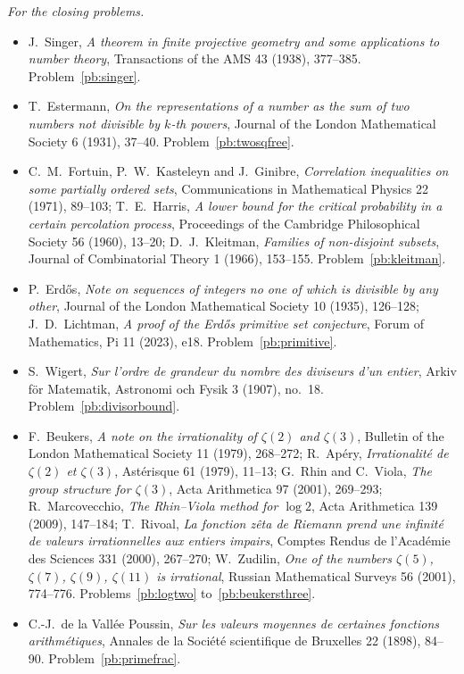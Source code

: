 \noindent\emph{For the closing problems.}
\begin{itemize}
\item J.~Singer, \emph{A theorem in finite projective geometry and some applications to number theory}, Transactions of the AMS 43 (1938), 377--385. Problem~\ref{pb:singer}.
\item T.~Estermann, \emph{On the representations of a number as the sum of two numbers not divisible by $k$-th powers}, Journal of the London Mathematical Society 6 (1931), 37--40. Problem~\ref{pb:twosqfree}.
\item C.~M.~Fortuin, P.~W.~Kasteleyn and J.~Ginibre, \emph{Correlation inequalities on some partially ordered sets}, Communications in Mathematical Physics 22 (1971), 89--103; T.~E.~Harris, \emph{A lower bound for the critical probability in a certain percolation process}, Proceedings of the Cambridge Philosophical Society 56 (1960), 13--20; D.~J.~Kleitman, \emph{Families of non-disjoint subsets}, Journal of Combinatorial Theory 1 (1966), 153--155. Problem~\ref{pb:kleitman}.
\item P.~Erd\H os, \emph{Note on sequences of integers no one of which is divisible by any other}, Journal of the London Mathematical Society 10 (1935), 126--128; J.~D.~Lichtman, \emph{A proof of the Erd\H os primitive set conjecture}, Forum of Mathematics, Pi 11 (2023), e18. Problem~\ref{pb:primitive}.
\item S.~Wigert, \emph{Sur l'ordre de grandeur du nombre des diviseurs d'un entier}, Arkiv för Matematik, Astronomi och Fysik 3 (1907), no.~18. Problem~\ref{pb:divisorbound}.
\item F.~Beukers, \emph{A note on the irrationality of $\zeta(2)$ and $\zeta(3)$}, Bulletin of the London Mathematical Society 11 (1979), 268--272; R.~Apéry, \emph{Irrationalité de $\zeta(2)$ et $\zeta(3)$}, Astérisque 61 (1979), 11--13; G.~Rhin and C.~Viola, \emph{The group structure for $\zeta(3)$}, Acta Arithmetica 97 (2001), 269--293; R.~Marcovecchio, \emph{The Rhin--Viola method for $\log2$}, Acta Arithmetica 139 (2009), 147--184; T.~Rivoal, \emph{La fonction zêta de Riemann prend une infinité de valeurs irrationnelles aux entiers impairs}, Comptes Rendus de l'Académie des Sciences 331 (2000), 267--270; W.~Zudilin, \emph{One of the numbers $\zeta(5)$, $\zeta(7)$, $\zeta(9)$, $\zeta(11)$ is irrational}, Russian Mathematical Surveys 56 (2001), 774--776. Problems~\ref{pb:logtwo} to~\ref{pb:beukersthree}.
\item C.-J.~de la Vallée Poussin, \emph{Sur les valeurs moyennes de certaines fonctions arithmétiques}, Annales de la Société scientifique de Bruxelles 22 (1898), 84--90. Problem~\ref{pb:primefrac}.

\end{itemize}
